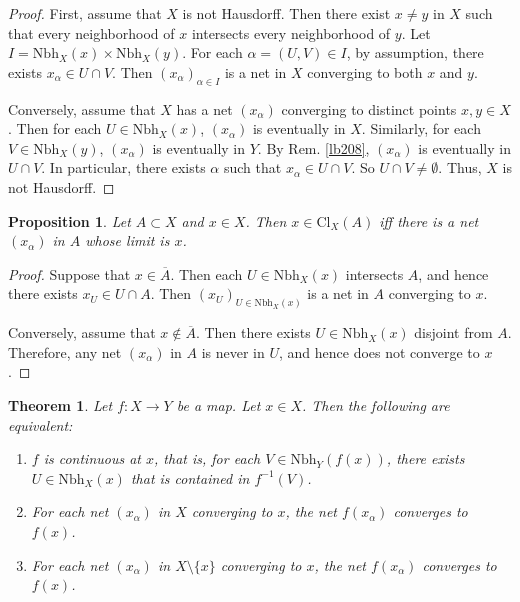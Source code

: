 \documentclass[12pt,b5paper,notitlepage]{article}
\theoremstyle{definition}
\theoremstyle{plain}
\newtheorem{thm}[df]{Theorem}
\newtheorem{pp}[df]{Proposition}
\newcommand{\ovl}{\overline}
\newcommand{\Nbh}{\mathrm{Nbh}}
\newcommand{\Cl}{\mathrm{Cl}}
\numberwithin{equation}{section}
\begin{document}
\begin{proof}
First, assume that $X$ is not Hausdorff. Then there exist $x\neq y$ in $X$ such that every neighborhood of $x$ intersects every neighborhood of $y$. Let $I=\Nbh_X(x)\times\Nbh_X(y)$. For each $\alpha=(U,V)\in I$, by assumption, there exists $x_\alpha\in U\cap V$. Then $(x_\alpha)_{\alpha\in I}$ is a net in $X$ converging to both $x$ and $y$.

Conversely, assume that $X$ has a net $(x_\alpha)$ converging to distinct points $x,y\in X$. Then for each $U\in\Nbh_X(x)$, $(x_\alpha)$ is eventually in $X$. Similarly, for each $V\in\Nbh_X(y)$, $(x_\alpha)$ is eventually in $Y$. By Rem. \ref{lb208}, $(x_\alpha)$ is eventually in $U\cap V$. In particular, there exists $\alpha$ such that $x_\alpha\in U\cap V$. So $U\cap V\neq\emptyset$. Thus, $X$ is not Hausdorff.
\end{proof}


\begin{pp}\label{lb209}
Let $A\subset X$ and $x\in X$. Then $x\in\Cl_X(A)$ iff there is a net $(x_\alpha)$ in $A$ whose limit is $x$.
\end{pp}


\begin{proof}
Suppose that $x\in\ovl A$. Then each $U\in\Nbh_X(x)$ intersects $A$, and hence there exists $x_U\in U\cap A$. Then $(x_U)_{U\in\Nbh_X(x)}$ is a net in $A$ converging to $x$.

Conversely, assume that $x\notin\ovl A$. Then there exists $U\in\Nbh_X(x)$ disjoint from $A$. Therefore, any net $(x_\alpha)$ in $A$ is never in $U$, and hence does not converge to $x$.
\end{proof}


\begin{thm}\label{lb210}
Let $f:X\rightarrow Y$ be a map. Let $x\in X$. Then the following are equivalent:
\begin{enumerate}
\item[(1)] $f$ is continuous at $x$, that is, for each $V\in\Nbh_Y(f(x))$, there exists $U\in\Nbh_X(x)$ that is contained in $f^{-1}(V)$.
\item[(2)] For each net $(x_\alpha)$ in $X$ converging to $x$, the net $f(x_\alpha)$ converges to $f(x)$.
\item[(3)] For each net $(x_\alpha)$ in $X\setminus\{x\}$ converging to $x$, the net $f(x_\alpha)$ converges to $f(x)$.
\end{enumerate}
\end{thm}
\end{document}
